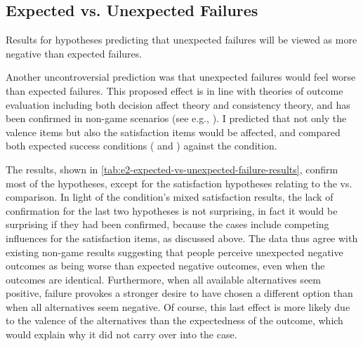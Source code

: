 \subsection{Expected vs\@. Unexpected Failures}

\begin{table}[!b]
\centering
\bgroup
\def\arraystretch{1.3}
\setlength{\tabcolsep}{0.6em}

\egroup
\caption[Retrospective expected vs\@. unexpected failure results]{Results for hypotheses predicting that unexpected failures will be viewed as more negative than expected failures.}
  \label{tab:e2-expected-vs-unexpected-failure-results}
\end{table}

Another uncontroversial prediction was that unexpected failures would feel worse than expected failures.
%
This proposed effect is in line with theories of outcome evaluation including both decision affect theory and consistency theory, and has been confirmed in non-game scenarios (see e.g., \citep{Shepperd2002}).
%
I predicted that not only the valence items but also the satisfaction items would be affected, and compared both expected success conditions (\unxf{} and \obvfm{}) against the \expf{} condition.


The results, shown in \cref{tab:e2-expected-vs-unexpected-failure-results}, confirm most of the hypotheses, except for the satisfaction hypotheses relating to the \obvfm{} vs\@. \expf{} comparison.
%
In light of the \obvfm{} condition's mixed satisfaction results, the lack of confirmation for the last two hypotheses is not surprising, in fact it would be surprising if they had been confirmed, because the \obvf{} cases include competing influences for the satisfaction items, as discussed above.
%
The data thus agree with existing non-game results suggesting that people perceive unexpected negative outcomes as being worse than expected negative outcomes, even when the outcomes are identical.
%
Furthermore, when all available alternatives seem positive, failure provokes a stronger desire to have chosen a different option than when all alternatives seem negative.
%
Of course, this last effect is more likely due to the valence of the alternatives than the expectedness of the outcome, which would explain why it did not carry over into the \obvfm{} case.

